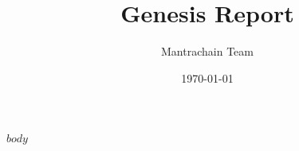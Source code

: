 \documentclass[12pt]{article}
\title{\textcolor{primary}{Genesis Report}}
\author{\textcolor{secondary}{Mantrachain Team}}
\date{\today}
\begin{document}
\maketitle
$body$
\end{document}
